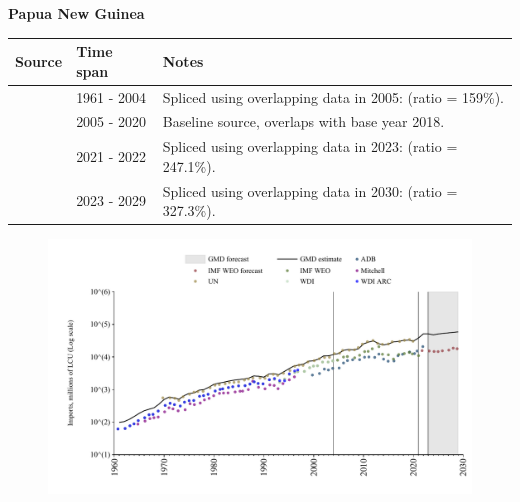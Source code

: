 \documentclass[12pt,a4paper,landscape]{article}
\begin{document}
\begin{adjustbox}{max totalsize={\paperwidth}{\paperheight},center}
\begin{minipage}[t][\textheight][t]{\textwidth}
\vspace*{0.5cm}
{}
\begin{center}
{\Large\bfseries Papua New Guinea}
\end{center}
\vspace{0.5cm}
\begin{table}[H]
\centering
\small
\begin{tabular}{|l|l|l|}
\hline
\textbf{Source} & \textbf{Time span} & \textbf{Notes} \\
\hline
\rowcolor{white}\cite{WDI}& 1961 - 2004 &Spliced using overlapping data in 2005: (ratio = 159\%).\\
\rowcolor{lightgray}\cite{UN}& 2005 - 2020 &Baseline source, overlaps with base year 2018.\\
\rowcolor{white}\cite{ADB}& 2021 - 2022 &Spliced using overlapping data in 2023: (ratio = 247.1\%).\\
\rowcolor{lightgray}\cite{IMF_WEO_forecast}& 2023 - 2029 &Spliced using overlapping data in 2030: (ratio = 327.3\%).\\
\hline
\end{tabular}
\end{table}
\begin{figure}[H]
\centering
\includegraphics[width=\textwidth,height=0.6\textheight,keepaspectratio]{graphs/PNG_imports.pdf}
\end{figure}
\end{minipage}
\end{adjustbox}
\end{document}
